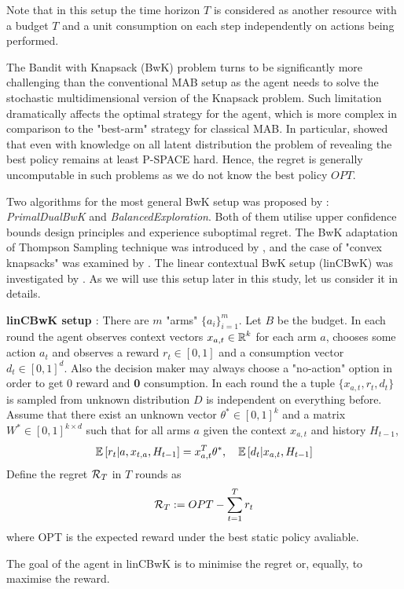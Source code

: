   
  Note that in this setup the time horizon $T$ is considered as another resource with a budget $T$ and a unit consumption on each step independently on actions being performed.
  
  The Bandit with Knapsack (BwK) problem turns to be significantly more challenging than the conventional MAB setup as the agent needs to solve the stochastic multidimensional version of the Knapsack problem. Such limitation dramatically affects the optimal strategy for the agent, which is more complex in comparison to the "best-arm" strategy for classical MAB. In particular, \cite{Papadimitriou1999} showed that even with knowledge on all latent distribution the problem of revealing the best policy remains at least P-SPACE hard. Hence, the regret is generally uncomputable in such problems as we do not know the best policy $OPT$. 
  
  Two algorithms for the most general BwK setup was proposed by \cite{Badanidiyuru2013}: \textit{PrimalDualBwK} and \textit{BalancedExploration}. Both of them utilise upper confidence bounds design principles and experience suboptimal regret. The BwK adaptation of Thompson Sampling technique was introduced by \cite{Xia2015}, and the case of "convex knapsacks" was examined by \cite{Agrawal2014}. The linear contextual BwK setup (linCBwK) was investigated by \cite{Agrawal2015}. As we will use this setup later in this study, let us consider it in details.
  
  \begin{definition} \textbf{linCBwK setup \cite{Agrawal2015}}:
      There are $m$ "arms" $\{a_i\}_{i=1}^m$. Let $B$ be the budget. In each round the agent observes context vectors $x_{a,t} \in \operatorname{\mathbb{R}}^k$ for each arm $a$, chooses some action $a_t$ and observes a reward $r_t \in [0, 1]$ and a consumption vector $d_t \in [0,1]^d$. Also the decision maker may always choose a "no-action" option in order to get 0 reward and \textbf{0} consumption. In each round the a tuple $\{x_{a,t}, r_t, d_t\}$ is sampled from unknown distribution $D$ is independent on everything before. Assume that there exist an unknown vector $\theta^* \in [0,1]^k$ and a matrix $W^* \in [0,1]^{k \times d}$ such that for all arms $a$ given the context $x_{a,t}$ and history $H_{t-1}$,
      \[
        \operatorname{\mathbb{E}}\left[r_t|a, x_{t,a}, H_{t-1}\right] = x_{a,t}^T\theta^*, \quad \operatorname{\mathbb{E}}\left[d_{t}|x_{a,t}, H_{t-1} \right]
      \]
      Define the regret $\operatorname{\mathcal{R}}_T$ in $T$ rounds as 
      \[
        \operatorname{\mathcal{R}}_T := OPT - \sum_{t=1}^T r_t
      \]
      where OPT is the expected reward under the best static policy avaliable. 
      
      The goal of the agent in linCBwK is to minimise the regret or, equally, to maximise the reward. 
      
  \end{definition} 

